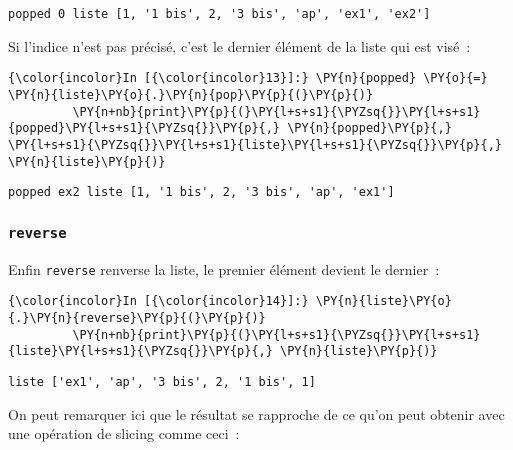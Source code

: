     \begin{Verbatim}[commandchars=\\\{\}]
popped 0 liste [1, '1 bis', 2, '3 bis', 'ap', 'ex1', 'ex2']

    \end{Verbatim}

    Si l'indice n'est pas précisé, c'est le dernier élément de la liste qui
est visé~:

    \begin{Verbatim}[commandchars=\\\{\}]
{\color{incolor}In [{\color{incolor}13}]:} \PY{n}{popped} \PY{o}{=} \PY{n}{liste}\PY{o}{.}\PY{n}{pop}\PY{p}{(}\PY{p}{)}
         \PY{n+nb}{print}\PY{p}{(}\PY{l+s+s1}{\PYZsq{}}\PY{l+s+s1}{popped}\PY{l+s+s1}{\PYZsq{}}\PY{p}{,} \PY{n}{popped}\PY{p}{,} \PY{l+s+s1}{\PYZsq{}}\PY{l+s+s1}{liste}\PY{l+s+s1}{\PYZsq{}}\PY{p}{,} \PY{n}{liste}\PY{p}{)}
\end{Verbatim}


    \begin{Verbatim}[commandchars=\\\{\}]
popped ex2 liste [1, '1 bis', 2, '3 bis', 'ap', 'ex1']

    \end{Verbatim}

    \hypertarget{reverse}{%
\subsubsection{\texorpdfstring{\texttt{reverse}}{reverse}}\label{reverse}}

    Enfin \texttt{reverse} renverse la liste, le premier élément devient le
dernier~:

    \begin{Verbatim}[commandchars=\\\{\}]
{\color{incolor}In [{\color{incolor}14}]:} \PY{n}{liste}\PY{o}{.}\PY{n}{reverse}\PY{p}{(}\PY{p}{)}
         \PY{n+nb}{print}\PY{p}{(}\PY{l+s+s1}{\PYZsq{}}\PY{l+s+s1}{liste}\PY{l+s+s1}{\PYZsq{}}\PY{p}{,} \PY{n}{liste}\PY{p}{)}
\end{Verbatim}


    \begin{Verbatim}[commandchars=\\\{\}]
liste ['ex1', 'ap', '3 bis', 2, '1 bis', 1]

    \end{Verbatim}

    On peut remarquer ici que le résultat se rapproche de ce qu'on peut
obtenir avec une opération de slicing comme ceci~:

